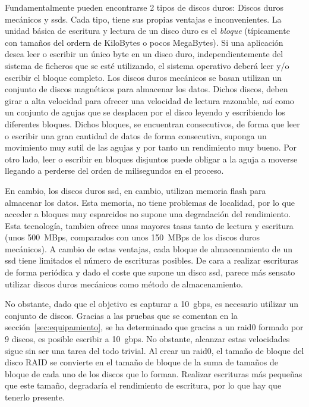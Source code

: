 Fundamentalmente pueden encontrarse 2 tipos de discos duros: Discos duros mecánicos y \glspl{ssd}. Cada tipo, tiene sus propias ventajas e inconvenientes. La unidad básica de escritura y lectura de un disco duro es el \textit{bloque} (típicamente con tamaños del ordern de KiloBytes o pocos MegaBytes). Si una aplicación desea leer o escribir un único byte en un disco duro, independientemente del sistema de ficheros que se esté utilizando, el sistema operativo deberá leer y/o escribir el bloque completo.
Los discos duros mecánicos se basan utilizan un conjunto de discos magnéticos para almacenar los datos. Dichos discos, deben girar a alta velocidad para ofrecer una velocidad de lectura razonable, así como un conjunto de agujas que se desplacen por el disco leyendo y escribiendo los diferentes bloques. Dichos bloques, se encuentran consecutivos, de forma que leer o escribir una gran cantidad de datos de forma consecutiva, suponga un movimiento muy sutil de las agujas y por tanto un rendimiento muy bueno. Por otro lado, leer o escribir en bloques disjuntos puede obligar a la aguja a moverse llegando a perderse del orden de milisegundos en el proceso.

En cambio, los discos duros \gls{ssd}, en cambio, utilizan memoria flash para almacenar los datos. Esta memoria, no tiene problemas de localidad, por lo que acceder a bloques muy esparcidos no supone una degradación del rendimiento. Esta tecnología, tambien ofrece unas mayores tasas tanto de lectura y escritura (unos 500~MBps, comparados con unos 150~MBps de los discos duros mecánicos). A cambio de estas ventajas, cada bloque de almacenamiento de un \gls{ssd} tiene limitados el número de escrituras posibles. De cara a realizar escrituras de forma periódica y dado el coste que supone un disco \gls{ssd}, parece más sensato utilizar discos duros mecánicos como método de almacenamiento.

No obstante, dado que el objetivo es capturar a 10~\gls{gbps}, es necesario utilizar un conjunto de discos. Gracias a las pruebas que se comentan en la sección~\ref{sec:equipamiento}, se ha determinado que gracias a un \gls{raid0} formado por 9 discos, es posible escribir a 10~\gls{gbps}. No obstante, alcanzar estas velocidades sigue sin ser una tarea del todo trivial. Al crear un \gls{raid0}, el tamaño de bloque del disco RAID se convierte en el tamaño de bloque de la suma de tamaños de bloque de cada uno de los discos que lo forman. Realizar escrituras más pequeñas que este tamaño, degradaría el rendimiento de escritura, por lo que hay que tenerlo presente.

